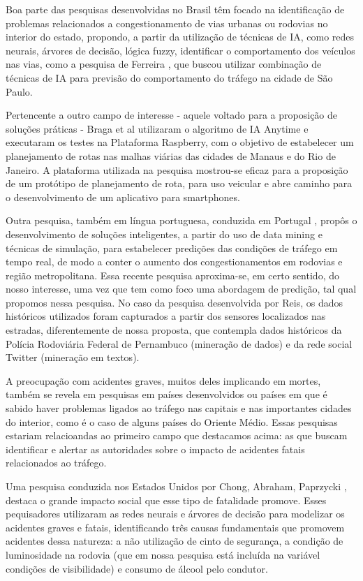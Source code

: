 Boa parte das pesquisas desenvolvidas no Brasil têm focado na identificação de problemas relacionados a congestionamento de vias urbanas ou rodovias no interior do estado, propondo, a partir da utilização de técnicas de IA, como redes neurais, árvores de decisão, lógica fuzzy, identificar o comportamento dos veículos nas vias, como a pesquisa de Ferreira \cite{ferreira2011combinaccao}, que buscou utilizar combinação de técnicas de IA para previsão do comportamento do tráfego na cidade de São Paulo.

Pertencente a outro campo de interesse - aquele voltado para a proposição de soluções práticas - Braga et al \cite{braga2014planejamento} utilizaram o algoritmo de IA Anytime e executaram os testes na Plataforma Raspberry, com o objetivo de estabelecer um planejamento de rotas nas malhas viárias das cidades de Manaus e do Rio de Janeiro. A plataforma utilizada na pesquisa mostrou-se eficaz para a proposição de um protótipo de planejamento de rota, para uso veicular e abre caminho para o desenvolvimento de um aplicativo para smartphones.  

Outra pesquisa, também em língua portuguesa, conduzida em Portugal \cite{dos2016previsao}, propôs o desenvolvimento de soluções inteligentes, a partir do uso de data mining e técnicas de simulação, para estabelecer predições das condições de tráfego em tempo real, de modo a conter o aumento dos congestionamentos em rodovias e região metropolitana. Essa recente pesquisa aproxima-se, em certo sentido, do nosso interesse, uma vez que tem como foco uma abordagem de predição, tal qual propomos nessa pesquisa. No caso da pesquisa desenvolvida por Reis, os dados históricos utilizados foram capturados a partir dos sensores localizados nas estradas, diferentemente de nossa proposta, que contempla dados históricos da Polícia Rodoviária Federal de Pernambuco (mineração de dados) e da rede social Twitter (mineração em textos).

A preocupação com acidentes graves, muitos deles implicando em mortes, também se revela em pesquisas em países desenvolvidos ou países em que é sabido haver problemas ligados ao tráfego nas capitais e nas importantes cidades do interior, como é o caso de alguns países do Oriente Médio. Essas pesquisas estariam relacioandas ao primeiro campo que destacamos acima: as que buscam identificar e alertar as autoridades sobre o impacto de acidentes fatais relacionados ao tráfego.

Uma pesquisa conduzida nos Estados Unidos por Chong, Abraham, Paprzycki \cite{chong2004traffic}, destaca o grande impacto social que esse tipo de fatalidade promove. Esses pequisadores utilizaram as redes neurais e árvores de decisão para modelizar os acidentes graves e fatais, identificando três causas fundamentais que promovem acidentes dessa natureza: a não utilização de cinto de segurança, a condição de luminosidade na rodovia (que em nossa pesquisa está incluída na variável condições de visibilidade) e consumo de álcool pelo condutor.

